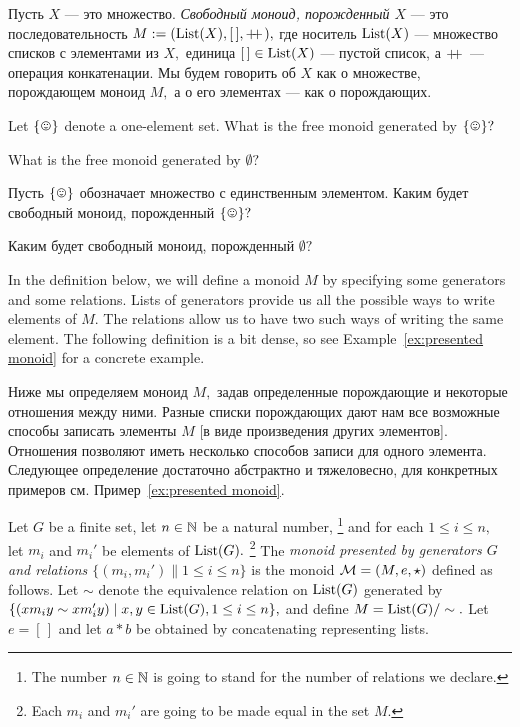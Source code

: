 \documentclass[../main/CT4S-EN-RU]{subfiles}
\begin{document}
\begin{definitionRUS}\label{def:free monoid}
Пусть $X$ — это множество. {\em Свободный моноид, порожденный $X$} — это последовательность $M:=(\operatorname{List}(X),[\,],+\!\!+\hspace{1pt}),$ где носитель $\operatorname{List}(X)$ — множество списков с элементами из $X,$ единица $[\,]\in\operatorname{List}(X)$ — пустой список, а $+\!\!+\hspace{1pt}$ — операция конкатенации. Мы будем говорить об $X$ как о множестве, порождающем моноид $M,$ а о его элементах — как о порождающих.
\end{definitionRUS}

\begin{exerciseENG}
Let $\singleton$ denote a one-element set.
\sexc What is the free monoid generated by $\singleton?$
\item What is the free monoid generated by $\emptyset?$
\endsexc
\end{exerciseENG}

\begin{exerciseRUS}
Пусть $\singleton$ обозначает множество с единственным элементом.
\sexc Каким будет свободный моноид, порожденный $\singleton?$
\item Каким будет свободный моноид, порожденный $\emptyset?$
\endsexc
\end{exerciseRUS}

\begin{blockENG}
In the definition below, we will define a monoid $M$ by specifying some generators and some relations. Lists of generators provide us all the possible ways to write elements of $M.$ The relations allow us to have two such ways of writing the same element. The following definition is a bit dense, so see Example~\ref{ex:presented monoid} for a concrete example.
\end{blockENG}

\begin{blockRUS}
Ниже мы определяем моноид $M,$ задав определенные порождающие и некоторые отношения между ними. Разные списки порождающих дают нам все возможные способы записать элементы $M$ [в виде произведения других элементов]. Отношения позволяют иметь несколько способов записи для одного элемента.%
Следующее определение достаточно абстрактно и тяжеловесно, для конкретных примеров см. Пример~\ref{ex:presented monoid}.
\end{blockRUS}

\begin{definitionENG}\label{def:presented monoid}
Let $G$ be a finite set, let $n\in{\mathbb N}$ be a natural number,%
\footnote{The number $n\in{\mathbb N}$ is going to stand for the number of relations we declare.}
and for each $1\leq i\leq n,$ let $m_i$ and $m_i'$ be elements of $\operatorname{List}(G).$%
\footnote{Each $m_i$ and $m_i'$ are going to be made equal in the set $M.$}
The {\em monoid presented by generators $G$ and relations $\{(m_i,m_i')\|1\leq i\leq n\}$} is the monoid $\mathcal{M}=(M,e,\star)$ defined as follows. Let $\sim$ denote the equivalence relation on $\operatorname{List}(G)$ generated by $\{(xm_iy\sim xm_i'y){\;|\;}x,y\in\operatorname{List}(G), 1\leq i\leq n\},$ and define $M=\operatorname{List}(G)/\sim.$ Let $e=[\,]$ and let $a * b$ be obtained by concatenating representing lists.
\end{definitionENG}
\end{document}
